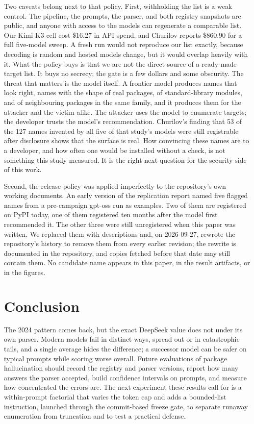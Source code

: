 \documentclass[10pt,twocolumn,letterpaper]{article}
\begin{document}
Two caveats belong next to that policy. First, withholding the list is a weak control. The
pipeline, the prompts, the parser, and both registry snapshots are public, and anyone with access
to the models can regenerate a comparable list. Our Kimi K3 cell cost \$16.27 in API spend, and
Churilov reports \$860.90 for a full five-model sweep. A fresh run would not reproduce our list
exactly, because decoding is random and hosted models change, but it would overlap heavily with
it. What the policy buys is that we are not the direct source of a ready-made target list. It buys
no secrecy; the gate is a few dollars and some obscurity. The threat that matters is the model
itself. A frontier model produces names that look right, names with the shape of real packages, of
standard-library modules, and of neighbouring packages in the same family, and it produces them for
the attacker and the victim alike. The attacker uses the model to enumerate targets; the developer
trusts the model's recommendation. Churilov's finding that 53 of the 127 names invented by all five
of that study's models were still registrable after disclosure shows that the surface is real. How
convincing these names are to a developer, and how often one would be installed without a check,
is not something this study measured. It is the right next question for the security side of this
work.

Second, the release policy was applied imperfectly to the repository's own working documents. An
early version of the replication report named five flagged names from a pre-campaign gpt-oss run
as examples. Two of them are registered on PyPI today, one of them registered ten months after the
model first recommended it. The other three were still unregistered when this paper was written.
We replaced them with descriptions and, on 2026-09-27, rewrote the repository's history to
remove them from every earlier revision; the rewrite is documented in the repository, and copies
fetched before that date may still contain them. No candidate name appears in this paper, in the
result artifacts, or in the figures.

\section{Conclusion}
\label{sec:conclusion}

The 2024 pattern comes back, but the exact DeepSeek value does not under its own parser. Modern
models fail in distinct ways, spread out or in catastrophic tails, and a single average hides the
difference; a successor model can be safer on typical prompts while scoring worse overall. Future
evaluations of package hallucination should record the registry and parser versions, report how
many answers the parser accepted, build confidence intervals on prompts, and measure how concentrated
the errors are. The next experiment these results call for is a within-prompt factorial that varies
the token cap and adds a bounded-list instruction, launched through the commit-based freeze gate, to
separate runaway enumeration from truncation and to test a practical defense.
\end{document}
